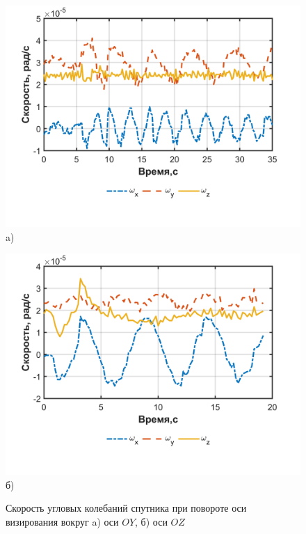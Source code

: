  \begin{figure}[h!]
	\begin{minipage}[b][][b]{0.49\linewidth}\centering
		\includegraphics[width=1\linewidth]{matlab/img/sat_gyro_dataY.png} \\ a)
	\end{minipage}
	\hfill
	\begin{minipage}[b][][b]{0.49\linewidth}\centering
		\includegraphics[width=1\linewidth]{matlab/img/sat_gyro_dataZ.png} \\ б)
	\end{minipage}
	\caption{Скорость угловых колебаний спутника при повороте оси визирования вокруг a) оси $OY$, б) оси $OZ$ }
	\label{fig:rotationYZ}
\end{figure}

